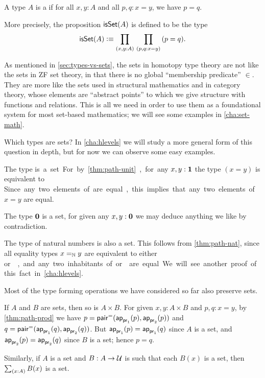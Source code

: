 \begin{defn}\label{defn:set}
  A type $A$ is a  if for all $x,y:A$ and all $p,q:x=y$, we have $p=q$.
\end{defn}

More precisely, the proposition $\isset(A)$ is defined to be the type
\[ \isset(A) \defeq \prd{x,y:A}{p,q:x=y} (p=q). \]

As mentioned in \autoref{sec:types-vs-sets},
the sets in homotopy type theory are not like the sets in ZF set theory, in that there is no global ``membership predicate'' $\in$.
They are more like the sets used in structural mathematics and in category theory, whose elements are ``abstract points'' to which we give structure with functions and relations.
This is all we need in order to use them as a foundational system for most set-based mathematics; we will see some examples in \autoref{cha:set-math}.

Which types are sets?
In \autoref{cha:hlevels} we will study a more general form of this question in depth, but for now we can observe some easy examples.

\begin{eg}
  The type \unit is a set.
  For by \autoref{thm:path-unit}, for any $x,y:\unit$ the type $(x=y)$ is equivalent to \unit.
  Since any two elements of \unit are equal, this implies that any two elements of $x=y$ are equal.
\end{eg}

\begin{eg}
  The type $\emptyt$ is a set, for given any $x,y:\emptyt$ we may deduce anything we like by contradiction.
\end{eg}

\begin{eg}\label{thm:nat-set}
  The type \nat of natural numbers is also a set.
  This follows from \autoref{thm:path-nat}, since all equality types $\id[\nat]xy$ are equivalent to either \unit or \emptyt, and any two inhabitants of \unit or \emptyt are equal.
  We will see another proof of this fact in \autoref{cha:hlevels}.
\end{eg}

Most of the type forming operations we have considered so far also preserve sets.

\begin{eg}\label{thm:isset-prod}
  If $A$ and $B$ are sets, then so is $A\times B$.
  For given $x,y:A\times B$ and $p,q:x=y$, by \autoref{thm:path-prod} we have $p= \pairpath(\projpath1(p),\projpath2(p))$ and $q= \pairpath(\projpath1(q),\projpath2(q))$.
  But $\projpath1(p)=\projpath1(q)$ since $A$ is a set, and $\projpath2(p)=\projpath2(q)$ since $B$ is a set; hence $p=q$.

  Similarly, if $A$ is a set and $B:A\to\type$ is such that each $B(x)$ is a set, then $\sm{x:A} B(x)$ is a set.
\end{eg}

